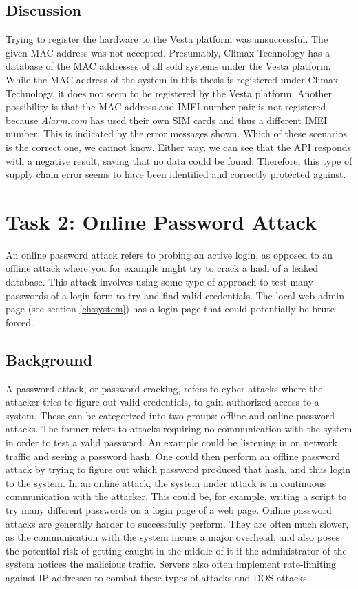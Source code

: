 \subsection{Discussion}
Trying to register the hardware to the Vesta platform was unsuccessful. The given MAC address was not accepted. Presumably, Climax Technology has a database of the MAC addresses of all sold systems under the Vesta platform. While the MAC address of the system in this thesis is registered under Climax Technology, it does not seem to be registered by the Vesta platform. Another possibility is that the MAC address and IMEI number pair is not registered because \textit{Alarm.com} has used their own SIM cards and thus a different IMEI number. This is indicated by the error messages shown. Which of these scenarios is the correct one, we cannot know. Either way, we can see that the API responds with a negative result, saying that no data could be found. Therefore, this type of supply chain error seems to have been identified and correctly protected against.

\section{Task 2: Online Password Attack}
An online password attack refers to probing an active login, as opposed to an offline attack where you for example might try to crack a hash of a leaked database. This attack involves using some type of approach to test many passwords of a login form to try and find valid credentials. The local web admin page (see section \ref{ch:system}) has a login page that could potentially be brute-forced.

\subsection{Background}
A password attack, or password cracking, refers to cyber-attacks where the attacker tries to figure out valid credentials, to gain authorized access to a system. These can be categorized into two groups: offline and online password attacks. The former refers to attacks requiring no communication with the system in order to test a valid password. An example could be listening in on network traffic and seeing a password hash. One could then perform an offline password attack by trying to figure out which password produced that hash, and thus login to the system. In an online attack, the system under attack is in continuous communication with the attacker. This could be, for example, writing a script to try many different passwords on a login page of a web page. Online password attacks are generally harder to successfully perform. They are often much slower, as the communication with the system incurs a major overhead, and also poses the potential risk of getting caught in the middle of it if the administrator of the system notices the malicious traffic. Servers also often implement rate-limiting against IP addresses to combat these types of attacks and DOS attacks.

